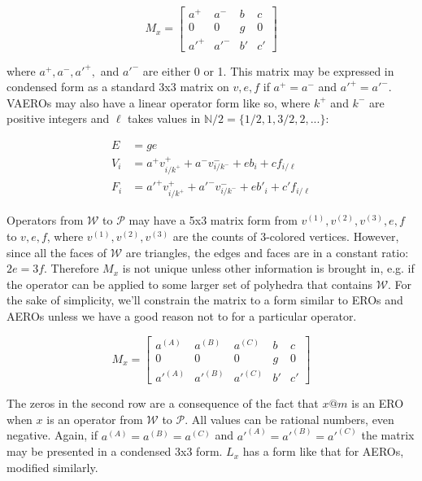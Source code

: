 \documentclass{amsart}[12pt]
\begin{document}
\begin{equation}
  M_x = \begin{bmatrix}
  a^+ & a^- & b & c \\
  0 & 0 & g & 0 \\
  a'^+ & a'^- & b' & c' \end{bmatrix}
\end{equation}

where $a^+, a^-, a'^+,$ and $a'^-$ are either 0 or 1. This matrix may be
expressed in condensed form as a standard 3x3 matrix on $v, e, f$ if $a^+ = a^-$
and $a'^+ = a'^-$. VAEROs may also have a linear operator form like so, where $k^+$ and $k^-$ are positive integers and $\ell$ takes values in
$\mathbb{N}/2 = \{1/2, 1, 3/2, 2, ...\}$:

\begin{equation}
  \begin{split}
  E & = ge \\
  V_i & = a^+ v^+_{i/k^+} + a^- v^-_{i/k^-} + e b_i + c f_{i/\ell} \\
  F_i & = a'^+ v^+_{i/k^+} + a'^- v^-_{i/k^-} + e b'_i + c' f_{i/\ell}
  \end{split}
\end{equation}

Operators from $\mathcal{W}$ to $\mathcal{P}$ may have a 5x3 matrix form
from $v^{(1)}, v^{(2)}, v^{(3)}, e, f$ to $v, e, f$, where $v^{(1)}, v^{(2)},
v^{(3)}$ are the counts of 3-colored vertices. However, since all the faces of
$\mathcal{W}$ are triangles, the edges and faces are in a constant ratio: $2e =
3f$. Therefore $M_x$ is not unique unless other information is brought in, e.g.
if the operator can be applied to some larger set of polyhedra that contains
$\mathcal{W}$. For the sake of simplicity, we'll constrain the matrix to a form
similar to EROs and AEROs unless we have a good reason not to for a particular
operator.

\begin{equation}
  M_x = \begin{bmatrix}
  a^{(A)} & a^{(B)} & a^{(C)} & b & c \\
  0 & 0 & 0 & g & 0 \\
  {a'}^{(A)} & {a'}^{(B)} & {a'}^{(C)} & b' & c' \end{bmatrix}
\end{equation}

The zeros in the second row are a consequence of the fact that $x@m$ is an ERO
when $x$ is an operator from $\mathcal{W}$ to $\mathcal{P}$. All values can be
rational numbers, even negative. Again, if $a^{(A)} = a^{(B)} = a^{(C)}$ and
$a'^{(A)} = a'^{(B)} = a'^{(C)}$ the matrix may be presented in a condensed 3x3
form. $L_x$ has a form like that for AEROs, modified similarly.
\end{document}
